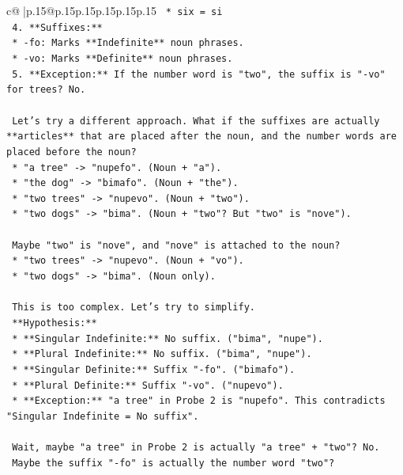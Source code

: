 \documentclass{article}
\begin{document}
{\begin{supertabular}{c@{$\;$}|p{.15\linewidth}@{}p{.15\linewidth}p{.15\linewidth}p{.15\linewidth}p{.15\linewidth}p{.15\linewidth}}
{{{\texttt{        *   six = si} \\
\texttt{    4.  **Suffixes:**} \\
\texttt{        *   {-}fo: Marks **Indefinite** noun phrases.} \\
\texttt{        *   {-}vo: Marks **Definite** noun phrases.} \\
\texttt{    5.  **Exception:** If the number word is "two", the suffix is "{-}vo" for trees? No.} \\
\\ 
\texttt{    Let's try a different approach. What if the suffixes are actually **articles** that are placed after the noun, and the number words are placed before the noun?} \\
\texttt{    *   "a tree" {-}> "nupefo". (Noun + "a").} \\
\texttt{    *   "the dog" {-}> "bimafo". (Noun + "the").} \\
\texttt{    *   "two trees" {-}> "nupevo". (Noun + "two").} \\
\texttt{    *   "two dogs" {-}> "bima". (Noun + "two"? But "two" is "nove").} \\
\\ 
\texttt{    Maybe "two" is "nove", and "nove" is attached to the noun?} \\
\texttt{    *   "two trees" {-}> "nupevo". (Noun + "vo").} \\
\texttt{    *   "two dogs" {-}> "bima". (Noun only).} \\
\\ 
\texttt{    This is too complex. Let's try to simplify.} \\
\texttt{    **Hypothesis:**} \\
\texttt{    *   **Singular Indefinite:** No suffix. ("bima", "nupe").} \\
\texttt{    *   **Plural Indefinite:** No suffix. ("bima", "nupe").} \\
\texttt{    *   **Singular Definite:** Suffix "{-}fo". ("bimafo").} \\
\texttt{    *   **Plural Definite:** Suffix "{-}vo". ("nupevo").} \\
\texttt{    *   **Exception:** "a tree" in Probe 2 is "nupefo". This contradicts "Singular Indefinite = No suffix".} \\
\\ 
\texttt{    Wait, maybe "a tree" in Probe 2 is actually "a tree" + "two"? No.} \\
\texttt{    Maybe the suffix "{-}fo" is actually the number word "two"?} \\
}}}
\end{supertabular}}
\end{document}
